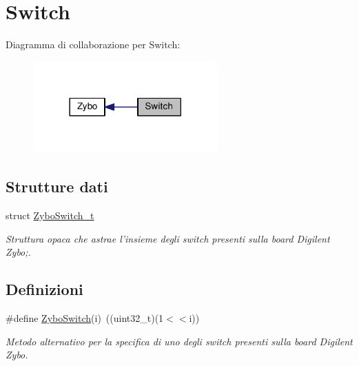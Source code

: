 \hypertarget{group___switch}{\section{Switch}
\label{group___switch}
}
Diagramma di collaborazione per Switch\+:
\nopagebreak
\begin{figure}[H]
\begin{center}
\leavevmode
\includegraphics[width=201pt]{group___switch}
\end{center}
\end{figure}
\subsection*{Strutture dati}
\begin{DoxyCompactItemize}
\item 
struct \hyperlink{struct_zybo_switch__t}{Zybo\+Switch\+\_\+t}
\begin{DoxyCompactList}\small\item\em Struttura opaca che astrae l'insieme degli switch presenti sulla board Digilent Zybo;. \end{DoxyCompactList}\end{DoxyCompactItemize}
\subsection*{Definizioni}
\begin{DoxyCompactItemize}
\item 
\#define \hyperlink{group___switch_ga1c463f6e1e3a43f68109c176772ce5cc}{Zybo\+Switch}(i)~((uint32\+\_\+t)(1$<$$<$i))
\begin{DoxyCompactList}\small\item\em Metodo alternativo per la specifica di uno degli switch presenti sulla board Digilent Zybo. \end{DoxyCompactList}\end{DoxyCompactItemize}
